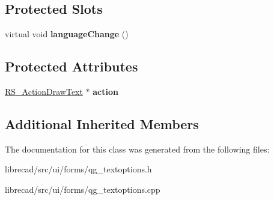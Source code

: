 \subsection*{Protected Slots}
\begin{DoxyCompactItemize}
\item 
\hypertarget{classQG__TextOptions_adfe152fe295bec2794b5b9ed5af59309}{virtual void {\bfseries language\-Change} ()}\label{classQG__TextOptions_adfe152fe295bec2794b5b9ed5af59309}

\end{DoxyCompactItemize}
\subsection*{Protected Attributes}
\begin{DoxyCompactItemize}
\item 
\hypertarget{classQG__TextOptions_a97da8b33383e52f1b56dea6960c200b4}{\hyperlink{classRS__ActionDrawText}{R\-S\-\_\-\-Action\-Draw\-Text} $\ast$ {\bfseries action}}\label{classQG__TextOptions_a97da8b33383e52f1b56dea6960c200b4}

\end{DoxyCompactItemize}
\subsection*{Additional Inherited Members}


The documentation for this class was generated from the following files\-:\begin{DoxyCompactItemize}
\item 
librecad/src/ui/forms/qg\-\_\-textoptions.\-h\item 
librecad/src/ui/forms/qg\-\_\-textoptions.\-cpp\end{DoxyCompactItemize}
